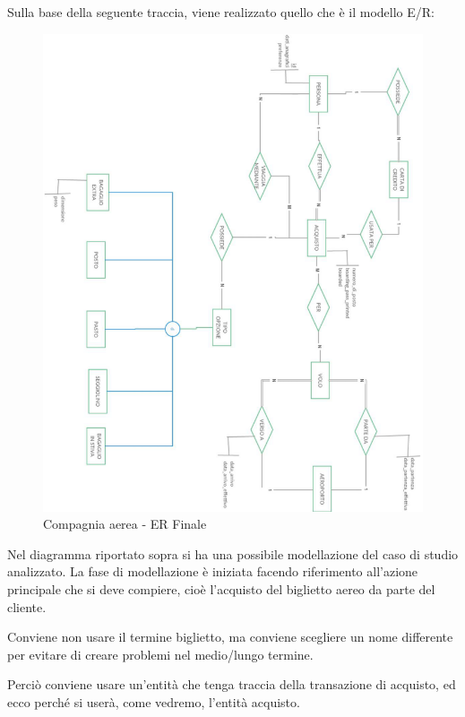 Sulla base della seguente traccia, viene realizzato quello che è il modello E/R:

\newpage
\begin{center}
\begin{figure}[H]
\centering
\includegraphics[scale=0.7]{figures/compagnia_aerea.png}
\caption{Compagnia aerea - ER Finale}
\end{figure}
\end{center}
\newpage

Nel diagramma riportato sopra si ha una possibile modellazione del caso di studio analizzato. La fase di modellazione è iniziata facendo riferimento all’azione principale che si deve compiere, cioè l’acquisto del biglietto aereo da parte del cliente.

Conviene non usare il termine biglietto, ma conviene scegliere un nome differente per evitare di creare problemi nel medio/lungo termine.

Perciò conviene usare un’entità che tenga traccia della transazione di acquisto, ed ecco perché si userà, come vedremo, l’entità acquisto.

